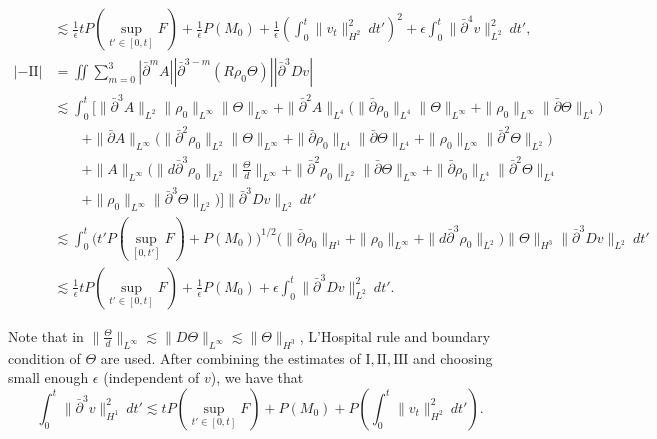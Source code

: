 \documentclass[12pt,a4paper]{amsart}
\numberwithin{equation}{section}
\theoremstyle{plain}
\theoremstyle{definition}
\newcommand{\bpartial}{\bar{\partial}}
\begin{document}
\begin{align*}
&\lesssim \frac{1}{\epsilon}tP(\sup\limits_{t'\in[0,t]}F)+\frac{1}{\epsilon}P(M_0)+\frac{1}{\epsilon}\left(\int_{0}^{t} \| v_t\|_{H^2}^2\ dt'\right)^2+\epsilon \int_{0}^{t}\|\bpartial^4 v\|_{L^2}^2\ dt',\\
|-\mathrm{II}|&= \iint \sum\limits_{m=0}^3| \bpartial^{m}  A| |\bpartial^{3-m} (  R\rho_0 \Theta)  | |\bpartial^3 D v|\\
&\lesssim \int_{0}^{t}  \bigg[ \|\bpartial ^3 A\|_{L^2} \|\rho_0\|_{L^{\infty}}\|\Theta\|_{L^{\infty}}
    +\|\bpartial^2 A\|_{L^4}
    \Big(\|\bpartial \rho_0\|_{L^4}\|\Theta\|_{L^{\infty}}
    +\| \rho_0\|_{L^{\infty}}\|\bpartial\Theta\|_{L^4}\Big)\\
&\qquad+\|\bpartial A\|_{L^{\infty}}\Big( \|\bpartial^2 \rho_0\|_{L^2}\|\Theta\|_{L^{\infty}}
    + \|\bpartial \rho_0\|_{L^4}\|\bpartial\Theta\|_{L^4}
    +\|\rho_0\|_{L^{\infty}}\|\bpartial^2 \Theta \|_{L^2} \Big)\\
&\qquad+\|A\|_{L^{\infty}}\Big( \|d \bpartial^3 \rho_0\|_{L^2} \|\frac{\Theta}{d}\|_{L^{\infty}}
+\|\bpartial^2 \rho_0\|_{L^2}\|\bpartial\Theta\|_{L^{\infty}}
+ \|\bpartial \rho_0\|_{L^4}\|\bpartial^2\Theta\|_{L^4}\\
\qquad&\qquad+\|\rho_0\|_{L^{\infty}}\|\bpartial^3 \Theta \|_{L^2}\Big)
\bigg]\|\bpartial^3 Dv\|_{L^2} \ dt' \\
&\lesssim   \int_{0}^{t} \Big( t'P(\sup\limits_{[0,t']}F)+P(M_0)  \Big)^{1/2}
\Big( 
\|\bpartial \rho_0\|_{H^1}
+\|\rho_0\|_{L^{\infty}}+\|d \bpartial^3 \rho_0\|_{L^2}\Big)\|\Theta\|_{H^3} \|\bpartial^3 Dv\|_{L^2}\ dt'\\
&\lesssim  \frac{1}{\epsilon}tP(\sup\limits_{t'\in[0,t]}F)+\frac{1}{\epsilon}P(M_0)+\epsilon \int_{0}^{t}\|\bpartial^3 Dv\|_{L^2}^2\ dt'.
\end{align*}

Note that in $\|\frac{\Theta}{d}\|_{L^{\infty}}\lesssim \|D\Theta\|_{L^{\infty}}\lesssim  \|\Theta\|_{H^3}$, L'Hospital rule and boundary condition of $\Theta$ are used.
After combining the estimates of $\mathrm{I}, \mathrm{II}, \mathrm{III}$ and choosing small enough $\epsilon$ (independent of $v$), we have that 
\begin{equation}\label{vxxx}
 \int_{0}^{t}\|\bpartial^3 v\|_{H^1}^2\ dt'\lesssim tP(\sup\limits_{t'\in[0,t]}F)+P(M_0)+P\left(\int_{0}^{t} \| v_t\|_{H^2}^2\ dt'\right).
\end{equation}

\vspace{0.3cm}
\end{document}
